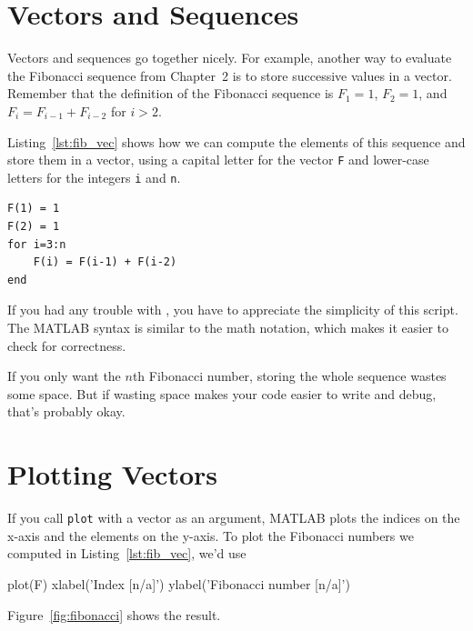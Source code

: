 \section{Vectors and Sequences}
\label{vecseq}


Vectors and sequences go together nicely.
For example, another way to evaluate the Fibonacci sequence from Chapter~2 is to
store successive values in a vector.  Remember that the definition of the
Fibonacci sequence is $F_1 = 1$, $F_2 = 1$, and
$F_{i} = F_{i-1} + F_{i-2}$ for $i > 2$.

Listing~\ref{lst:fib_vec} shows how we can compute the elements of this sequence and store them in a vector, using a capital letter for the vector \lstinline{F}
and lower-case letters for the integers \lstinline{i} and \lstinline{n}.

\begin{lstlisting}[caption={Calculating the Fibonacci sequence using a vector}, label={lst:fib_vec}]
F(1) = 1
F(2) = 1
for i=3:n
    F(i) = F(i-1) + F(i-2)
end
\end{lstlisting}

If you had any trouble with , you have to
appreciate the simplicity of this script.  The MATLAB syntax is
similar to the math notation, which makes it easier to check for
correctness.

If you only want the $n$th Fibonacci number, storing
the whole sequence wastes some space.  But if wasting space
makes your code easier to write and debug, that's probably okay.


\section{Plotting Vectors}


If you call \lstinline{plot} with a vector as an argument,
MATLAB plots the indices on the x-axis and the elements on the
y-axis.  To plot the Fibonacci numbers we computed in Listing~\ref{lst:fib_vec}, we'd use

\begin{code}
plot(F)
xlabel('Index [n/a]')
ylabel('Fibonacci number [n/a]')
\end{code}

Figure~\ref{fig:fibonacci} shows the result.


